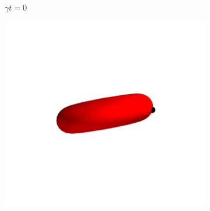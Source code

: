 \begin{figure}[t]
    \centering
    \begin{subfigure}{\textwidth}
    \begin{minipage}{0.2\textwidth}
        \centering
        \\
        $\dot{\gamma}t = 0$
    \end{minipage}%
    \begin{minipage}{0.2\textwidth}
        \centering
        \includegraphics[trim=75 100 75 100, clip, width=\textwidth]{figures/tumble1000.png}\\

\end{minipage}
\end{subfigure}
\end{figure}
